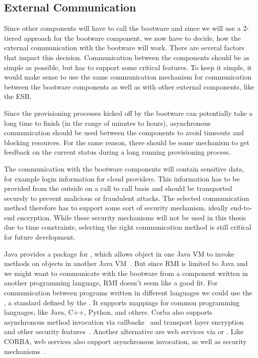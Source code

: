 \subsection{External Communication}
\label{design:communication}

Since other components will have to call the bootware and since we will use a 2-tiered approach for the bootware component, we now have to decide, how the external communication with the bootware will work.
There are several factors that impact this decision.
Communication between the components should be as simple as possible, but has to support some critical features.
To keep it simple, it would make sense to use the same communication mechanism for communication between the bootware components as well as with other external components, like the ESB.

Since the provisioning processes kicked off by the bootware can potentially take a long time to finish (in the range of minutes to hours), asynchronous communication should be used between the components to avoid timeouts and blocking resources.
For the same reason, there should be some mechanism to get feedback on the current status during a long running provisioning process.

The communication with the bootware components will contain sensitive data, for example login information for cloud providers.
This information has to be provided from the outside on a call to call basis and should be transported securely to prevent malicious or fraudulent attacks.
The selected communication method therefore has to support some sort of security mechanism, ideally end-to-end encryption.
While these security mechanisms will not be used in this thesis due to time constraints, selecting the right communication method is still critical for future development.

Java provides a package for , which allows object in one Java VM to invoke methods on objects in another Java VM~\autocite{rmi}.
But since RMI is limited to Java and we might want to communicate with the bootware from a component written in another programming language, RMI doesn't seem like a good fit.
For communication between programs written in different languages we could use the , a standard defined by the .
It supports mappings for common programming languages, like Java, C++, Python, and others.
Corba also supports asynchronous method invocation via callbacks~\autocite{corba:async} and transport layer encryption and other security features~\autocite{corba:security}.
Another alternative are web services via  or .
Like CORBA, web services also support asynchronous invocation, as well as security mechanisms~\autocite{ws:security}.

